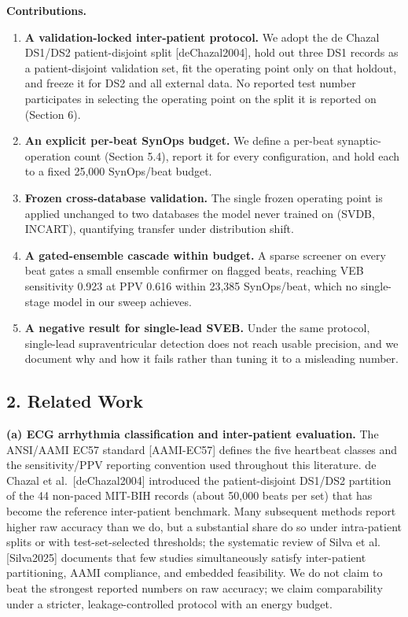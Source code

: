 \documentclass[
]{article}
\providecommand{\tightlist}{%
  \setlength{\itemsep}{0pt}\setlength{\parskip}{0pt}}
\begin{document}
\textbf{Contributions.}

\begin{enumerate}
\def\labelenumi{\arabic{enumi}.}
\tightlist
\item
  \textbf{A validation-locked inter-patient protocol.} We adopt the de
  Chazal DS1/DS2 patient-disjoint split {[}deChazal2004{]}, hold out
  three DS1 records as a patient-disjoint validation set, fit the
  operating point only on that holdout, and freeze it for DS2 and all
  external data. No reported test number participates in selecting the
  operating point on the split it is reported on (Section 6).
\item
  \textbf{An explicit per-beat SynOps budget.} We define a per-beat
  synaptic-operation count (Section 5.4), report it for every
  configuration, and hold each to a fixed 25,000 SynOps/beat budget.
\item
  \textbf{Frozen cross-database validation.} The single frozen operating
  point is applied unchanged to two databases the model never trained on
  (SVDB, INCART), quantifying transfer under distribution shift.
\item
  \textbf{A gated-ensemble cascade within budget.} A sparse screener on
  every beat gates a small ensemble confirmer on flagged beats, reaching
  VEB sensitivity 0.923 at PPV 0.616 within 23,385 SynOps/beat, which no
  single-stage model in our sweep achieves.
\item
  \textbf{A negative result for single-lead SVEB.} Under the same
  protocol, single-lead supraventricular detection does not reach usable
  precision, and we document why and how it fails rather than tuning it
  to a misleading number.
\end{enumerate}

\subsection{2. Related Work}\label{related-work}

\textbf{(a) ECG arrhythmia classification and inter-patient evaluation.}
The ANSI/AAMI EC57 standard {[}AAMI-EC57{]} defines the five heartbeat
classes and the sensitivity/PPV reporting convention used throughout
this literature. de Chazal et al.~{[}deChazal2004{]} introduced the
patient-disjoint DS1/DS2 partition of the 44 non-paced MIT-BIH records
(about 50,000 beats per set) that has become the reference inter-patient
benchmark. Many subsequent methods report higher raw accuracy than we
do, but a substantial share do so under intra-patient splits or with
test-set-selected thresholds; the systematic review of Silva et al.
{[}Silva2025{]} documents that few studies simultaneously satisfy
inter-patient partitioning, AAMI compliance, and embedded feasibility.
We do not claim to beat the strongest reported numbers on raw accuracy;
we claim comparability under a stricter, leakage-controlled protocol
with an energy budget.
\end{document}
